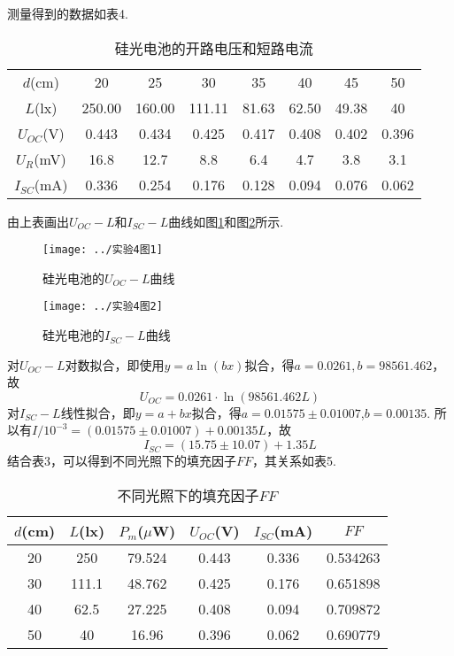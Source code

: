 \documentclass[11pt]{article}
\begin{document}
测量得到的数据如表4.
\begin{table}[htbp]\small
	\centering
	\caption{硅光电池的开路电压和短路电流}
	\begin{tabular}{cccccccc}
		\toprule
	$ d $(cm)      & 20    & 25    & 30    & 35    & 40    & 45    & 50    \\
	$ L $(lx) &250.00 & 160.00 & 111.11 & 81.63 &62.50 & 49.38 & 40 \\
		\midrule
	$ U_{OC} $(V)    & 0.443 & 0.434 & 0.425 & 0.417 & 0.408 & 0.402 & 0.396 \\
	\midrule
	$ U_R $(mV)         & 16.8  & 12.7  & 8.8   & 6.4   & 4.7   & 3.8   & 3.1   \\
	$ I_{SC} $(mA) & 0.336 & 0.254 & 0.176 & 0.128 & 0.094 & 0.076 & 0.062 \\
	\bottomrule
	\end{tabular}
\end{table}

由上表画出$ U_{OC}-L $和$ I_{SC}-L $曲线如图\ref{fig:41}和图\ref{fig:42}所示.
\begin{figure}[htbp]
	\centering
	\texttt{[image: ../实验4图1]}
	\caption{硅光电池的$ U_{OC}-L $曲线}
	\label{fig:41}
\end{figure}
\begin{figure}[htbp]
	\centering
	\texttt{[image: ../实验4图2]}
	\caption{硅光电池的$ I_{SC}-L $曲线}
	\label{fig:42}
\end{figure}

对$ U_{OC}-L $对数拟合，即使用$ y=a\ln (bx) $拟合，得$ a=0.0261,b=98561.462 $，故$$ U_{OC}=0.0261\cdot \ln(98561.462 L) $$
对$ I_{SC}-L $线性拟合，即$ y=a+bx $拟合，得$ a=0.01575\pm 0.01007 $,$ b=0.00135 $. 所以有$ I/10^{-3}=(0.01575\pm 0.01007)+0.00135L $，故
$$ I_{SC}=(15.75\pm 10.07)+1.35 L $$
结合表3，可以得到不同光照下的填充因子$ FF $，其关系如表5.
\begin{table}[htbp]\small
	\centering
	\caption{不同光照下的填充因子$ FF $}
	\begin{tabular}{cccccc}
		\toprule
		$ d $(cm) & $ L $(lx) & $ P_m $($ \mu $W) & $ U_{OC} $(V) & $ I_{SC} $(mA) & $ FF $       \\
		\midrule
		20    & 250   & 79.524   & 0.443  & 0.336   & 0.534263 \\
		30    & 111.1 & 48.762   & 0.425  & 0.176   & 0.651898 \\
		40    & 62.5  & 27.225   & 0.408  & 0.094   & 0.709872 \\
		50    & 40    & 16.96    & 0.396  & 0.062   & 0.690779 \\
		\bottomrule
	\end{tabular}
\end{table}
\end{document}
